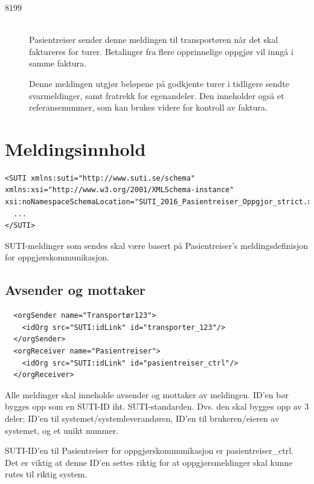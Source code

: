\documentclass[a4paper,titlepage,norsk,11pt]{article}
\begin{document}
\begin{description}

	\item[8199] \hfill \\
	Pasientreiser sender denne meldingen til transportøren når det skal faktureres for turer. Betalinger fra flere opprinnelige oppgjør vil inngå i samme faktura.

	Denne meldingen utgjør beløpene på godkjente turer i tidligere sendte svarmeldinger, samt fratrekk for egenandeler. Den inneholder også et referansenummer, som kan brukes videre for kontroll av faktura.

\end{description}

\section{Meldingsinnhold}
\label{sec:Meldingsinnhold}

\begin{lstlisting}
<SUTI xmlns:suti="http://www.suti.se/schema" xmlns:xsi="http://www.w3.org/2001/XMLSchema-instance" xsi:noNamespaceSchemaLocation="SUTI_2016_Pasientreiser_Oppgjor_strict.xsd">
  ...
</SUTI>
\end{lstlisting}

SUTI-meldinger som sendes skal være basert på Pasientreiser's meldingsdefinisjon for oppgjørskommunikasjon.

\subsection{Avsender og mottaker}

\begin{lstlisting}
  <orgSender name="Transportør123">
    <idOrg src="SUTI:idLink" id="transporter_123"/>
  </orgSender>
  <orgReceiver name="Pasientreiser">
    <idOrg src="SUTI:idLink" id="pasientreiser_ctrl"/>
  </orgReceiver>
\end{lstlisting}

Alle meldinger skal inneholde avsender og mottaker av meldingen. ID'en bør bygges opp som en SUTI-ID iht. SUTI-standarden. Dvs. den skal bygges opp av 3 deler; ID'en til systemet/systemleverandøren, ID'en til brukeren/eieren av systemet, og et unikt nummer.

SUTI-ID'en til Pasientreiser for oppgjørskommunikasjon er pasientreiser\_ctrl. Det er viktig at denne ID'en settes riktig for at oppgjørsmeldinger skal kunne rutes til riktig system.
\end{document}
